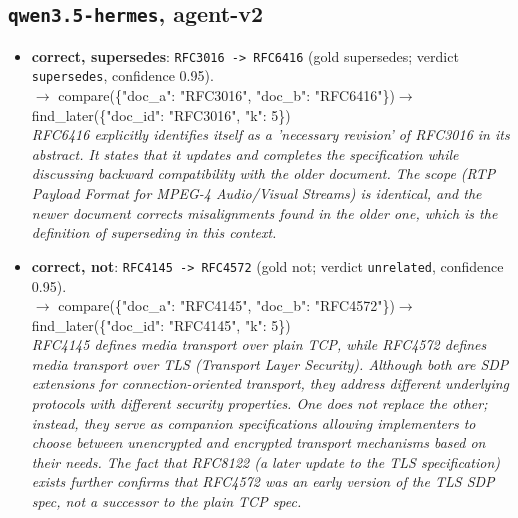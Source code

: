 \subsection*{\texttt{qwen3.5-hermes}, agent-v2}
\begin{itemize}
\item \textbf{correct, supersedes}: \texttt{RFC3016 -> RFC6416} (gold supersedes; verdict \texttt{supersedes}, confidence 0.95).\\ {\small\ttfamily $\rightarrow$ compare(\{"doc\_a": "RFC3016", "doc\_b": "RFC6416"\})\newline $\rightarrow$ find\_later(\{"doc\_id": "RFC3016", "k": 5\})}\\ \emph{RFC6416 explicitly identifies itself as a 'necessary revision' of RFC3016 in its abstract. It states that it updates and completes the specification while discussing backward compatibility with the older document. The scope (RTP Payload Format for MPEG-4 Audio/Visual Streams) is identical, and the newer document corrects misalignments found in the older one, which is the definition of superseding in this context.}
\item \textbf{correct, not}: \texttt{RFC4145 -> RFC4572} (gold not; verdict \texttt{unrelated}, confidence 0.95).\\ {\small\ttfamily $\rightarrow$ compare(\{"doc\_a": "RFC4145", "doc\_b": "RFC4572"\})\newline $\rightarrow$ find\_later(\{"doc\_id": "RFC4145", "k": 5\})}\\ \emph{RFC4145 defines media transport over plain TCP, while RFC4572 defines media transport over TLS (Transport Layer Security). Although both are SDP extensions for connection-oriented transport, they address different underlying protocols with different security properties. One does not replace the other; instead, they serve as companion specifications allowing implementers to choose between unencrypted and encrypted transport mechanisms based on their needs. The fact that RFC8122 (a later update to the TLS specification) exists further confirms that RFC4572 was an early version of the TLS SDP spec, not a successor to the plain TCP spec.}

\end{itemize}
